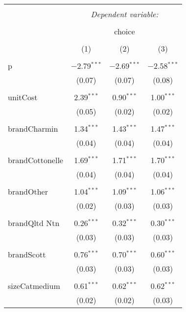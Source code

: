 
\begin{table}[!htbp] \centering 
  \caption{} 
  \label{tab:mnlPhillyRand} 
\begin{tabular}{@{\extracolsep{5pt}}lccc} 
\\[-1.8ex]\hline 
\hline \\[-1.8ex] 
 & \multicolumn{3}{c}{\textit{Dependent variable:}} \\ 
\cline{2-4} 
\\[-1.8ex] & \multicolumn{3}{c}{choice} \\ 
\\[-1.8ex] & (1) & (2) & (3)\\ 
\hline \\[-1.8ex] 
 p & $-$2.79$^{***}$ & $-$2.69$^{***}$ & $-$2.58$^{***}$ \\ 
  & (0.07) & (0.07) & (0.08) \\ 
  & & & \\ 
 unitCost & 2.39$^{***}$ & 0.90$^{***}$ & 1.00$^{***}$ \\ 
  & (0.05) & (0.02) & (0.02) \\ 
  & & & \\ 
 brandCharmin & 1.34$^{***}$ & 1.43$^{***}$ & 1.47$^{***}$ \\ 
  & (0.04) & (0.04) & (0.04) \\ 
  & & & \\ 
 brandCottonelle & 1.69$^{***}$ & 1.71$^{***}$ & 1.70$^{***}$ \\ 
  & (0.04) & (0.04) & (0.04) \\ 
  & & & \\ 
 brandOther & 1.04$^{***}$ & 1.09$^{***}$ & 1.06$^{***}$ \\ 
  & (0.02) & (0.03) & (0.03) \\ 
  & & & \\ 
 brandQltd Ntn & 0.26$^{***}$ & 0.32$^{***}$ & 0.30$^{***}$ \\ 
  & (0.03) & (0.03) & (0.03) \\ 
  & & & \\ 
 brandScott & 0.76$^{***}$ & 0.70$^{***}$ & 0.60$^{***}$ \\ 
  & (0.03) & (0.03) & (0.03) \\ 
  & & & \\ 
 sizeCatmedium & 0.61$^{***}$ & 0.62$^{***}$ & 0.62$^{***}$ \\ 
  & (0.02) & (0.02) & (0.03) \\ 

\end{tabular}
\end{table}

